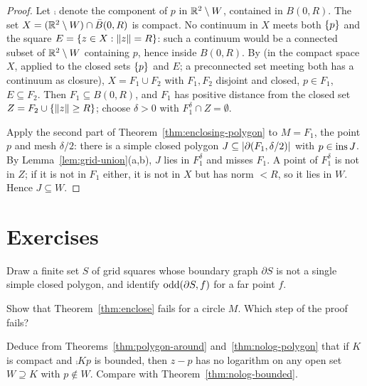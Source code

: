 \begin{proof}
Let $\comp{}{}$ denote the component of $p$ in $\mathbb{R}^2\setminus W$, contained in $B(0,R)$. The set
$X=(\mathbb{R}^2\setminus W)\cap\bar B(0,R)$ is compact. No continuum in $X$ meets both $\left\{ p \right\}$ and the square
$E=\left\{ z\in X:\lVert z\rVert=R \right\}$: such a continuum would be a connected subset of $\mathbb{R}^2\setminus W$
containing $p$, hence inside $B(0,R)$. By  (in the compact space $X$, applied to
the closed sets $\left\{ p \right\}$ and $E$; a preconnected set meeting both has a continuum as closure),
$X=F_1\cup F_2$ with $F_1,F_2$ disjoint and closed, $p\in F_1$, $E\subseteq F_2$. Then $F_1\subseteq
B(0,R)$, and $F_1$ has positive distance from the closed set $Z=F_2\cup\left\{ \lVert z\rVert\ge R \right\}$; choose
$\delta>0$ with $F_1^{\delta}\cap Z=\emptyset$.

Apply the second part of Theorem~\ref{thm:enclosing-polygon} to $M=F_1$, the point $p$ and mesh
$\delta/2$: there is a simple closed polygon $J\subseteq\lvert \partial(F_1,\delta/2)\rvert$ with $p\in\operatorname{ins} J$.
By Lemma~\ref{lem:grid-union}(a,b), $J$ lies in $F_1^{\delta}$ and misses $F_1$. A point of
$F_1^{\delta}$ is not in $Z$; if it is not in $F_1$ either, it is not in $X$ but has norm $<R$, so it
lies in $W$. Hence $J\subseteq W$.
\end{proof}


\section*{Exercises}

\begin{exercise}
Draw a finite set $S$ of grid squares whose boundary graph $\partial S$ is not a single simple
closed polygon, and identify $\operatorname{odd}(\partial S,f)$ for a far point $f$.
\end{exercise}

\begin{exercise}
Show that Theorem~\ref{thm:enclose} fails for a circle $M$. Which step of the proof fails?
\end{exercise}

\begin{exercise}
Deduce from Theorems~\ref{thm:polygon-around} and~\ref{thm:nolog-polygon} that if $K$ is compact and
$\comp Kp$ is bounded, then $z-p$ has no logarithm on any open set $W\supseteq K$ with $p\notin W$.
Compare with Theorem~\ref{thm:nolog-bounded}.
\end{exercise}
